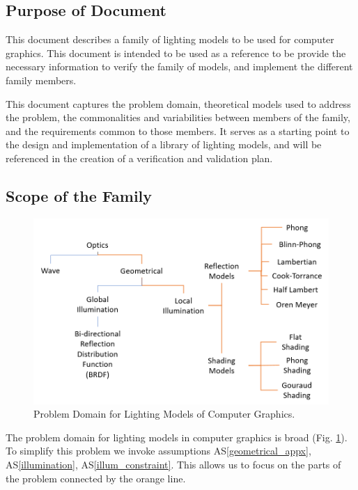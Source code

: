 \documentclass[12pt]{article}
\newcommand{\aSref}[1]{AS\ref{#1}}
\begin{document}
\subsection{Purpose of Document}
This document describes a family of lighting models to be used for computer 
graphics. This document is intended to be used as a reference to be provide the 
necessary information to verify the family of models, and implement the 
different family members. 

This document captures the problem domain, theoretical models used to address 
the problem, the commonalities and variabilities between members of the family, 
and the requirements common to those members. It serves as a starting point to 
the design and implementation of a library of lighting models, and will be 
referenced in the creation of a verification and validation plan.

\subsection{Scope of the Family} \label{sec_problem_definition}
\begin{figure}[h]
	\centering
	\includegraphics[scale=0.5]{./images/problem-domain-analysis}
	\caption{Problem Domain for Lighting Models of Computer Graphics.}
	\label{fig:prob-domain-analysis}
\end{figure}

The problem domain for lighting models in computer graphics is broad (Fig. 
\ref{fig:prob-domain-analysis}). To simplify this problem we invoke assumptions 
\aSref{geometrical_appx}, \aSref{illumination}, \aSref{illum_constraint}. This 
allows us to focus on the parts of the problem connected by the orange line.
\end{document}
